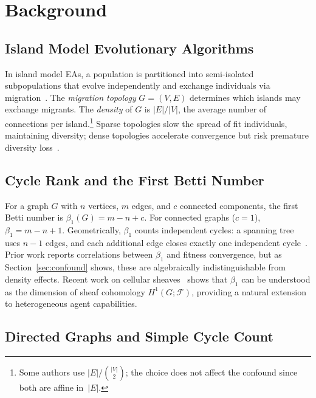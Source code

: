 \documentclass{llncs}
\begin{document}
\section{Background}
\label{sec:background}

\subsection{Island Model Evolutionary Algorithms}

In island model EAs, a population is partitioned into semi-isolated
subpopulations that evolve independently and exchange individuals via
migration~\cite{tomassini2005spatially}. The \emph{migration topology}
$G = (V, E)$ determines which islands may exchange migrants. The \emph{density}
of $G$ is $|E|/|V|$, the average number of connections per
island.\footnote{Some authors use $|E|/\binom{|V|}{2}$; the choice does not
affect the confound since both are affine in~$|E|$.} Sparse topologies
slow the spread of fit individuals, maintaining diversity; dense topologies
accelerate convergence but risk premature diversity
loss~\cite{alba2002parallel,skolicki2005influence}.

\subsection{Cycle Rank and the First Betti Number}

For a graph $G$ with $n$ vertices, $m$ edges, and $c$ connected components, the
first Betti number is $\beta_1(G) = m - n + c$.
For connected graphs ($c = 1$), $\beta_1 = m - n + 1$. Geometrically, $\beta_1$
counts independent cycles: a spanning tree uses $n-1$ edges, and each additional
edge closes exactly one independent
cycle~\cite{hatcher2002algebraic}. Prior work reports correlations
between $\beta_1$ and fitness convergence, but as Section~\ref{sec:confound}
shows, these are algebraically indistinguishable from density effects.
Recent work on cellular sheaves~\cite{hanks2025cellular} shows that $\beta_1$
can be understood as the dimension of sheaf cohomology $H^1(G;\mathcal{F})$,
providing a natural extension to heterogeneous agent capabilities.

\subsection{Directed Graphs and Simple Cycle Count}
\end{document}
